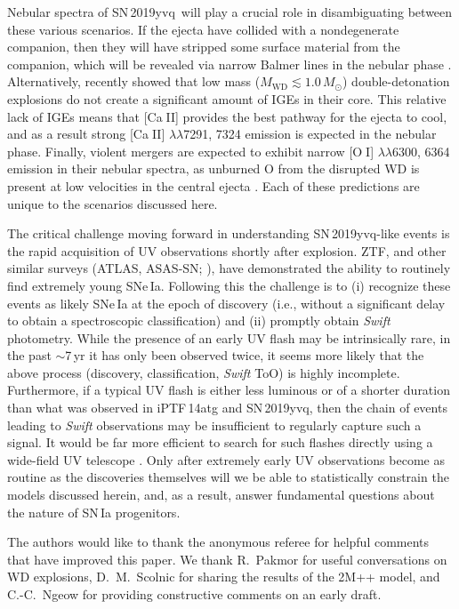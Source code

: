 \documentclass[twocolumn]{aastex63}
\def\ion#1#2{#1$\;${\footnotesize\rm{#2}}\relax}
\newcommand{\sn}{SN\,2019yvq}
\begin{document}
Nebular spectra of \sn\ will play a crucial role in disambiguating between
these various scenarios. If the ejecta have collided with a nondegenerate
companion, then they will have stripped some surface material from the
companion, which will be revealed via narrow Balmer lines in the nebular phase
\citep[e.g.,][]{Wheeler75}. Alternatively, \citet{Polin19a} recently showed
that low mass ($M_\mathrm{WD} \lesssim 1.0\,M_\odot$) double-detonation
explosions do not create a significant amount of IGEs in their core. This
relative lack of IGEs means that [\ion{Ca}{II}] provides the best pathway for
the ejecta to cool, and as a result strong [\ion{Ca}{II}]
$\lambda\lambda$7291, 7324 emission is expected in the nebular phase. Finally,
violent mergers are expected to exhibit narrow [\ion{O}{I}]
$\lambda\lambda$6300, 6364 emission in their nebular spectra, as unburned O
from the disrupted WD is present at low velocities in the central ejecta
\citep{Taubenberger13,Kromer16}. Each of these predictions are unique to the
scenarios discussed here.

The critical challenge moving forward in understanding \sn-like events is the
rapid acquisition of UV observations shortly after explosion. ZTF, and other
similar surveys (ATLAS, ASAS-SN; \citealt{Tonry11,Holoien17}), have
demonstrated the ability to routinely find extremely young SNe\,Ia. Following
this the challenge is to (i) recognize these events as likely SNe\,Ia at the
epoch of discovery (i.e., without a significant delay to obtain a
spectroscopic classification) and (ii) promptly obtain \textit{Swift}
photometry. While the presence of an early UV flash may be intrinsically rare,
in the past $\sim$7\,yr it has only been observed twice, it seems more likely
that the above process (discovery, classification, \textit{Swift} ToO) is
highly incomplete. Furthermore, if a typical UV flash is either less luminous
or of a shorter duration than what was observed in iPTF\,14atg and \sn, then
the chain of events leading to \textit{Swift} observations may be insufficient
to regularly capture such a signal. It would be far more efficient to search
for such flashes directly using a wide-field UV telescope
\citep[e.g.,][]{Sagiv14}. Only after extremely early UV observations become as
routine as the discoveries themselves will we be able to statistically
constrain the models discussed herein, and, as a result, answer fundamental
questions about the nature of SN\,Ia progenitors.


\acknowledgements

The authors would like to thank the anonymous referee for helpful comments
that have improved this paper. We thank R.~Pakmor for useful conversations on
WD explosions, D.~M.~Scolnic for sharing the results of the 2M++ model, and
C.-C.~Ngeow for providing constructive comments on an early draft.
\end{document}
